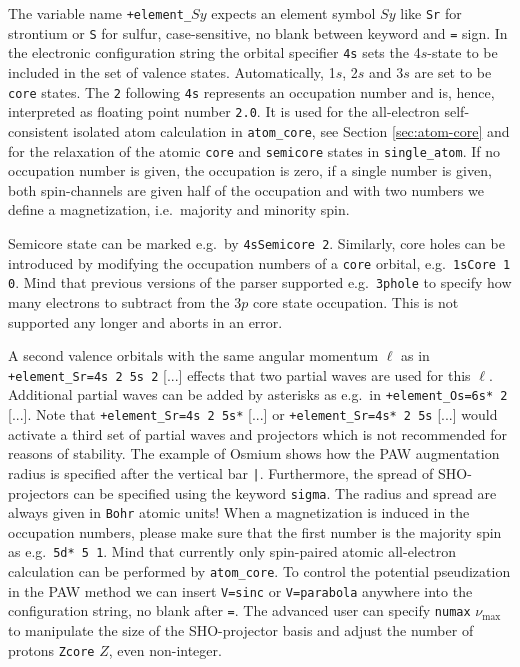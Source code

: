 \documentclass[oribibl]{llncs}
\newcommand{\um}[1]{_{\mathrm{#1}}}
\newcommand{\ttt}[1]{\texttt{#1}}
\begin{document}
The variable name \ttt{+element\_}$Sy$ expects an element symbol $Sy$ 
like \ttt{Sr} for strontium or \ttt{S} for sulfur, case-sensitive, no blank between keyword and \ttt{=} sign.
In the electronic configuration string the orbital specifier \ttt{4s} sets the 4$s$-state to be 
included in the set of valence states. Automatically, 1$s$, 2$s$ and 3$s$ are set to 
be \ttt{core} states.
The \ttt{2} following \ttt{4s} represents an occupation number
and is, hence, interpreted as floating point number \ttt{2.0}.
It is used for the all-electron self-consistent isolated atom calculation in \ttt{atom\_core}, see Section \ref{sec:atom-core}
and for the relaxation of the atomic \ttt{core} and \ttt{semicore} states in \ttt{single\_atom}.
If no occupation number is given, the occupation is zero, if a single number is given,
both spin-channels are given half of the occupation and with two numbers
we define a magnetization, i.e.~majority and minority spin.

\noindent
Semicore state can be marked e.g.~by \ttt{4sSemicore 2}.
Similarly, core holes can be introduced by modifying the occupation numbers of
a \ttt{core} orbital, e.g.~\ttt{1sCore 1 0}.
Mind that previous versions of the parser supported e.g.~\ttt{3phole}
to specify how many electrons to subtract from the $3p$ core state occupation.
This is not supported any longer and aborts in an error.

\noindent
A second valence orbitals with the same angular momentum $\ell$ as in \ttt{+element\_Sr=4s 2 5s 2} [...] 
effects that two partial waves are used for this $\ell$.
Additional partial waves can be added by asterisks as e.g.~in \ttt{+element\_Os=6s* 2} [...].
Note that \ttt{+element\_Sr=4s 2 5s*} [...] or \ttt{+element\_Sr=4s* 2 5s} [...] %
would activate a third set of partial waves and projectors which is not recommended for reasons of stability.
The example of Osmium shows how the \ac{PAW} augmentation radius is specified after the vertical bar \ttt{|}.
Furthermore, the spread of \ac{SHO}-projectors can be specified using the keyword \ttt{sigma}.
The radius and spread are always given in \ttt{Bohr} atomic units!
\noindent
When a magnetization is induced in the occupation numbers,
please make sure that the first number is the majority spin as e.g.~\ttt{5d* 5 1}.
Mind that currently only spin-paired atomic all-electron calculation can be performed by \ttt{atom\_core}.
%
To control the potential pseudization in the \ac{PAW} method we can insert 
\ttt{V=sinc} or \ttt{V=parabola} anywhere into the configuration string, no blank after \ttt{=}.
The advanced user can specify \ttt{numax} $\nu\um{max}$ to manipulate the size of the \ac{SHO}-projector basis
and adjust the number of protons \ttt{Zcore} $Z$, even non-integer.
%
%
%
\end{document}
